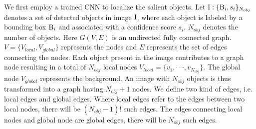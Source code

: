 \documentclass[10pt,twocolumn,letterpaper]{article}
\begin{document}
We first employ a trained CNN  \cite{zhang:2015:CVPR:boundingbox} to localize the salient objects. Let ${\rm I}:{\{ {{\rm B}_i},{s_i}\} _{{N_{obj}}}}$ denotes a set of detected objects in image ${\rm I}$, where each object is labeled by a bounding box ${{\rm B}_i}$ and associated with a confidence score ${s_i}$, $N_{obj}$ denotes the number of objects.
Here $G(V,E)$ is an undirected fully connected graph. 
$V = \{{V_{local}},{V_{global}}\}$ represents the nodes and $E$ represents the set of edges connecting the nodes. Each object present in the image contributes to a graph node resulting in a total of $N_{obj}$ local nodes ${V_{local}} = \{ {v_1}, \cdot  \cdot  \cdot ,{v_{{N_{obj}}}}\} $. The global node $V_{global}$ represents the background. An image with $N_{obj}$ objects is thus transformed into a graph having $N_{obj}+1$ nodes. We define two kind of edges, i.e. local edges and global edges. Where local edges refer to the edges between two local nodes, there will be $({N_{obj}} - 1)!$ such edges. The edges connecting local nodes and global node are global edges, there will be $N_{obj}$ such edges.
\end{document}
